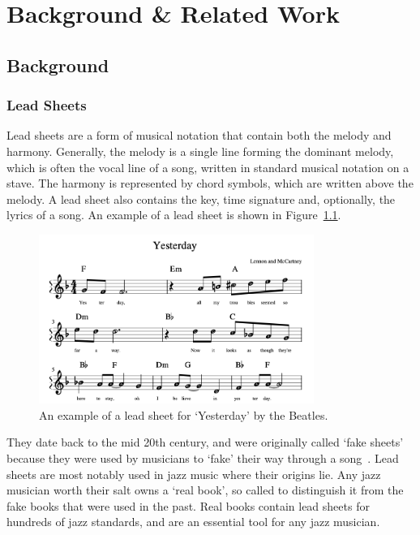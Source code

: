 \chapter{Background \& Related Work}

\section{Background}

\subsection{Lead Sheets}

Lead sheets are a form of musical notation that contain both the melody and harmony. Generally, the melody is a single line forming the dominant melody, which is often the vocal line of a song, written in standard musical notation on a stave. The harmony is represented by chord symbols, which are written above the melody. A lead sheet also contains the key, time signature and, optionally, the lyrics of a song. An example of a lead sheet is shown in Figure~\ref{fig:lead_sheet_example}.


\begin{figure}[h]
    \centering
    \includegraphics[width=0.8\textwidth]{images/lead_sheet_example.png}
    \caption{An example of a lead sheet for `Yesterday' by the Beatles.}
    \label{fig:lead_sheet_example}
\end{figure}

They date back to the mid 20th century, and were originally called `fake sheets' because they were used by musicians to `fake' their way through a song~\cite{RealBookPodcast}. Lead sheets are most notably used in jazz music where their origins lie. Any jazz musician worth their salt owns a `real book', so called to distinguish it from the fake books that were used in the past. Real books contain lead sheets for hundreds of jazz standards, and are an essential tool for any jazz musician. 

